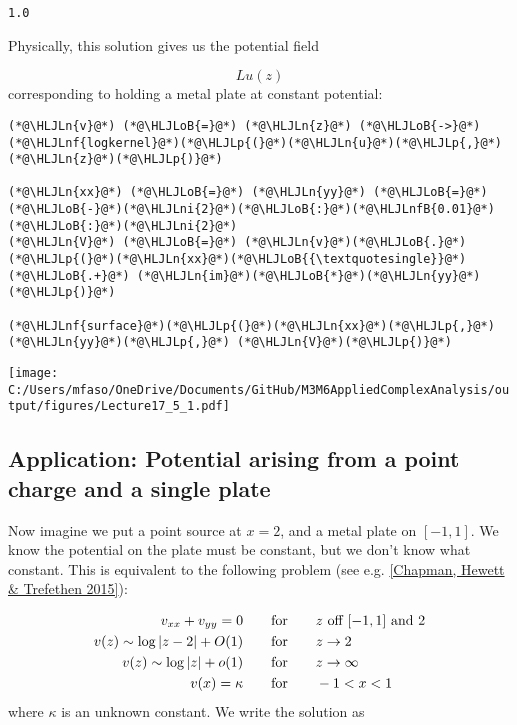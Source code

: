 \documentclass[12pt,a4paper]{article}
\newcommand{\HLJLn}[1]{#1}
\newcommand{\HLJLnf}[1]{\textcolor[RGB]{66,102,213}{#1}}
\newcommand{\HLJLnfB}[1]{\textcolor[RGB]{59,151,46}{#1}}
\newcommand{\HLJLni}[1]{\textcolor[RGB]{59,151,46}{#1}}
\newcommand{\HLJLoB}[1]{\textcolor[RGB]{102,102,102}{\textbf{#1}}}
\newcommand{\HLJLp}[1]{#1}
\def\qqfor{\qquad\hbox{for}\qquad}
\begin{document}
\begin{lstlisting}
1.0
\end{lstlisting}


Physically, this solution gives us the potential field

\[
L u(z)
\]
corresponding to holding a metal plate at constant potential:


\begin{lstlisting}
(*@\HLJLn{v}@*) (*@\HLJLoB{=}@*) (*@\HLJLn{z}@*) (*@\HLJLoB{->}@*) (*@\HLJLnf{logkernel}@*)(*@\HLJLp{(}@*)(*@\HLJLn{u}@*)(*@\HLJLp{,}@*) (*@\HLJLn{z}@*)(*@\HLJLp{)}@*)

(*@\HLJLn{xx}@*) (*@\HLJLoB{=}@*) (*@\HLJLn{yy}@*) (*@\HLJLoB{=}@*) (*@\HLJLoB{-}@*)(*@\HLJLni{2}@*)(*@\HLJLoB{:}@*)(*@\HLJLnfB{0.01}@*)(*@\HLJLoB{:}@*)(*@\HLJLni{2}@*)
(*@\HLJLn{V}@*) (*@\HLJLoB{=}@*) (*@\HLJLn{v}@*)(*@\HLJLoB{.}@*)(*@\HLJLp{(}@*)(*@\HLJLn{xx}@*)(*@\HLJLoB{{\textquotesingle}}@*) (*@\HLJLoB{.+}@*) (*@\HLJLn{im}@*)(*@\HLJLoB{*}@*)(*@\HLJLn{yy}@*)(*@\HLJLp{)}@*)

(*@\HLJLnf{surface}@*)(*@\HLJLp{(}@*)(*@\HLJLn{xx}@*)(*@\HLJLp{,}@*) (*@\HLJLn{yy}@*)(*@\HLJLp{,}@*) (*@\HLJLn{V}@*)(*@\HLJLp{)}@*)
\end{lstlisting}

\texttt{[image: C:/Users/mfaso/OneDrive/Documents/GitHub/M3M6AppliedComplexAnalysis/output/figures/Lecture17\_5\_1.pdf]}

\subsection{Application: Potential arising from a point charge and a single plate}
Now imagine we put a point source at $x = 2$, and a metal plate on $[-1,1]$. We know the potential on the plate must be constant, but we don't know what constant. This is equivalent to the following problem (see e.g. \href{https://people.maths.ox.ac.uk/trefethen/chapman_hewett_trefethen.pdf}{[Chapman, Hewett \& Trefethen 2015]}):


\begin{align*}
v_{xx} + v_{yy} = 0 &\qqfor \hbox{$z$ off $[-1,1]$ and $2$}  \\
v(z) \sim \log |z - 2| + O(1) &\qqfor z \rightarrow 2 \\
v(z) \sim \log|z| + o(1) &\qqfor z \rightarrow \infty \\
v(x) = \kappa &\qqfor -1 < x < 1
\end{align*}
where $\kappa$ is an unknown constant.  We write the solution as
\end{document}
